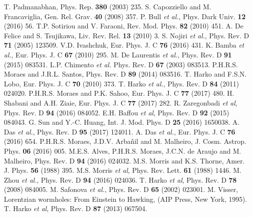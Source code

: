 \documentclass[twocolumn,showpacs,aps,amssymb,floatfix,prd,amsmath,preprintnumbers]{revtex4}
\begin{document}
\begin{references}

 T. Padmanabhan, Phys. Rep. {\bf 380} (2003) 235.
 S. Capozziello and M. Francaviglia, Gen. Rel. Grav. {\bf 40} (2008) 357.
 P. Bull {\it et al.}, Phys. Dark Univ. {\bf 12} (2016) 56.
 T.P. Sotiriou and V. Faraoni, Rev. Mod. Phys. {\bf 82} (2010) 451.
 A. De Felice and S. Tsujikawa, Liv. Rev. Rel. {\bf 13} (2010) 3.
 S. Nojiri {\it et al.}, Phys. Rev. D {\bf 71} (2005) 123509.
 V.D. Ivashchuk, Eur. Phys. J. C {\bf 76} (2016) 431.
 K. Bamba {\it et al.}, Eur. Phys. J. C {\bf 67} (2010) 295.
 M. De Laurentis {\it et al.}, Phys. Rev. D {\bf 91} (2015) 083531.
 L.P. Chimento {\it et al.} Phys. Rev. D {\bf 67} (2003) 083513.
 P.H.R.S. Moraes and J.R.L. Santos, Phys. Rev. D {\bf 89} (2014) 083516.
 T. Harko and F.S.N. Lobo, Eur. Phys. J. C {\bf 70} (2010) 373.
 T. Harko {\it et al.}, Phys. Rev. D {\bf 84} (2011) 024020.
 P.H.R.S. Moraes and P.K. Sahoo, Eur. Phys. J. C {\bf 77} (2017) 480.
 H. Shabani and A.H. Ziaie, Eur. Phys. J. C {\bf 77} (2017) 282.
 R. Zaregonbadi {\it et al}, Phys. Rev. D {\bf 94} (2016) 084052.
 E.H. Baffou {\it et al}, Phys. Rev. D {\bf 92} (2015) 084043.
 G. Sun and Y.-C. Huang, Int. J. Mod. Phys. D {\bf 25} (2016) 1650038.
 A. Das {\it et al.}, Phys. Rev. D {\bf 95} (2017) 124011.
 A. Das {\it et al.}, Eur. Phys. J. C {\bf 76} (2016) 654.
 P.H.R.S. Moraes, J.D.V. Arba\~nil and M. Malheiro, J. Cosm. Astrop. Phys. {\bf 06} (2016) 005.
 M.E.S. Alves, P.H.R.S. Moraes, J.C.N. de Araujo and M. Malheiro, Phys. Rev. D {\bf 94} (2016) 024032.
 M.S. Morris and K.S. Thorne, Amer. J. Phys. {\bf 56} (1988) 395.
 M.S. Morris {\it et al}, Phys. Rev. Lett. {\bf 61} (1988) 1446.
 M. Zhou {\it et al.}, Phys. Rev. D {\bf 94} (2016) 024036.
 T. Harko {\it et al}, Phys. Rev. D {\bf 78} (2008) 084005.
 M. Safonova {\it et al.}, Phys. Rev. D {\bf 65} (2002) 023001.
 M. Visser, Lorentzian wormholes: From Einstein to Hawking, (AIP Press, New York, 1995).
 T. Harko {\it et al}, Phys. Rev. D {\bf 87} (2013) 067504.

\end{references}
\end{document}
